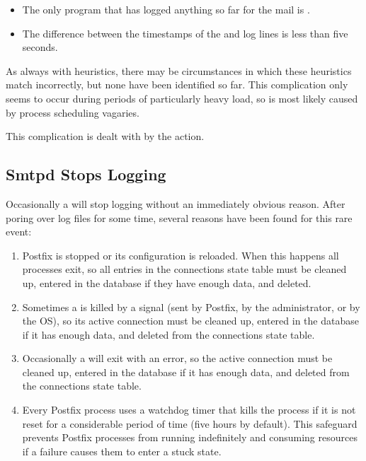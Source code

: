 \begin{itemize}

    \squeezeitems{}

    \item The only program that has logged anything so far for the mail is
        .

    \item The difference between the timestamps of the  and
         log lines is less than five seconds.

\end{itemize}

As always with heuristics, there may be circumstances in which these
heuristics match incorrectly, but none have been identified so far.  This
complication only seems to occur during periods of particularly heavy load,
so is most likely caused by process scheduling vagaries.

This complication is dealt with by the  action.

\subsection{Smtpd Stops Logging}

\label{smtpd stops logging}

Occasionally a  will stop logging without an immediately
obvious reason.  After poring over log files for some time, several reasons
have been found for this rare event:

\begin{enumerate}

    \item Postfix is stopped or its configuration is reloaded.  When this
        happens all  processes exit, so all entries in the
        connections state table must be cleaned up, entered in the database
        if they have enough data, and deleted.

    \item Sometimes a  is killed by a signal (sent by
        Postfix, by the administrator, or by the OS), so its active
        connection must be cleaned up, entered in the database if it has
        enough data, and deleted from the connections state table.

    \item Occasionally a  will exit with an error, so the
        active connection must be cleaned up, entered in the database if it
        has enough data, and deleted from the connections state table.

    \item Every Postfix process uses a watchdog timer that kills the
        process if it is not reset for a considerable period of time (five
        hours by default).  This safeguard prevents Postfix processes from
        running indefinitely and consuming resources if a failure causes
        them to enter a stuck state.

\end{enumerate}

